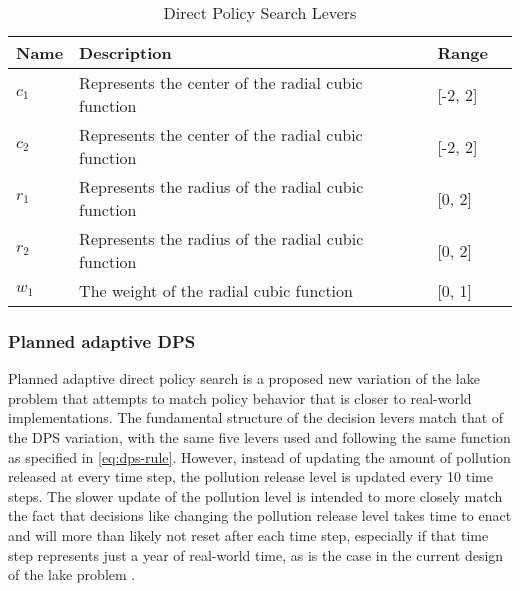         \begin{table}[h]
            \caption{Direct Policy Search Levers}
            
            \label{table:levers-dps}
            
            \setlength\arrayrulewidth{1pt}
            \begin{tabularx}{\textwidth}{l|X|l|l}
                \rowcolor{tudelft-dark-blue!80}
                \color{white}\bfseries Name     &      \color{white}\bfseries Description   &
                \color{white}\bfseries Range    \\
                
                \hline
                $c_{1}$          & Represents the center of the radial cubic function         & [-2, 2]       \\
                \hline
                $c_{2}$          & Represents the center of the radial cubic function         & [-2, 2]       \\
                \hline
                $r_{1}$          & Represents the radius of the radial cubic function         & [0, 2]        \\
                \hline
                $r_{2}$          & Represents the radius of the radial cubic function         & [0, 2]        \\
                \hline
                $w_{1}$          & The weight of the radial cubic function                    & [0, 1]        \\
                
            \end{tabularx}
        \end{table}

        \subsubsection{Planned adaptive DPS}
        Planned adaptive direct policy search is a proposed new variation of the lake problem that attempts to match policy behavior that is closer to real-world implementations. The fundamental structure of the decision levers match that of the DPS variation, with the same five levers used and following the same function as specified in \cref{eq:dps-rule}. However, instead of updating the amount of pollution released at every time step, the pollution release level is updated every 10 time steps. The slower update of the pollution level is intended to more closely match the fact that decisions like changing the pollution release level takes time to enact and will more than likely not reset after each time step, especially if that time step represents just a year of real-world time, as is the case in the current design of the lake problem \citep{Ward2015}. 

